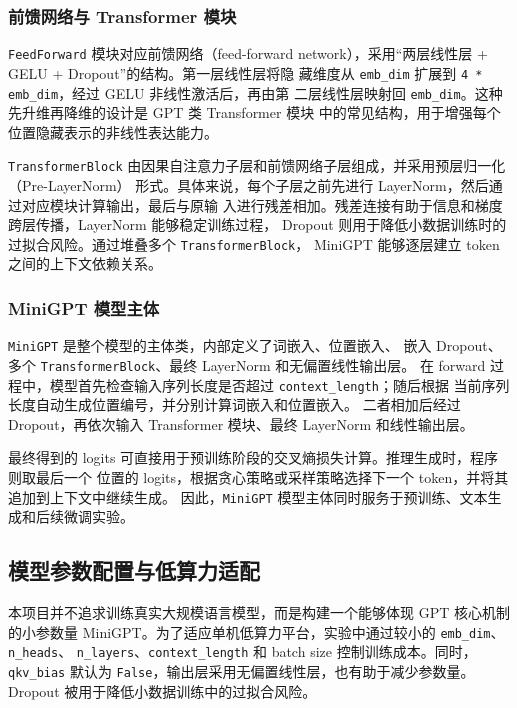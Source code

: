 \documentclass[UTF8,a4paper,zihao=-4,fontset=none]{ctexart}
\numberwithin{equation}{section}
\begin{document}
\subsubsection{前馈网络与 Transformer 模块}

\texttt{FeedForward} 模块对应前馈网络（feed-forward network），采用“两层线性层 + GELU + Dropout”的结构。第一层线性层将隐
藏维度从 \texttt{emb\_dim} 扩展到 \texttt{4 * emb\_dim}，经过 GELU 非线性激活后，再由第
二层线性层映射回 \texttt{emb\_dim}。这种先升维再降维的设计是 GPT 类 Transformer 模块
中的常见结构，用于增强每个位置隐藏表示的非线性表达能力。

\texttt{TransformerBlock} 由因果自注意力子层和前馈网络子层组成，并采用预层归一化（Pre-LayerNorm）
形式。具体来说，每个子层之前先进行 LayerNorm，然后通过对应模块计算输出，最后与原输
入进行残差相加。残差连接有助于信息和梯度跨层传播，LayerNorm 能够稳定训练过程，
Dropout 则用于降低小数据训练时的过拟合风险。通过堆叠多个 \texttt{TransformerBlock}，
MiniGPT 能够逐层建立 token 之间的上下文依赖关系。

\subsubsection{MiniGPT 模型主体}

\texttt{MiniGPT} 是整个模型的主体类，内部定义了词嵌入、位置嵌入、
嵌入 Dropout、多个 \texttt{TransformerBlock}、最终 LayerNorm 和无偏置线性输出层。
在 forward 过程中，模型首先检查输入序列长度是否超过 \texttt{context\_length}；随后根据
当前序列长度自动生成位置编号，并分别计算词嵌入和位置嵌入。
二者相加后经过 Dropout，再依次输入 Transformer 模块、最终 LayerNorm 和线性输出层。

最终得到的 logits 可直接用于预训练阶段的交叉熵损失计算。推理生成时，程序则取最后一个
位置的 logits，根据贪心策略或采样策略选择下一个 token，并将其追加到上下文中继续生成。
因此，\texttt{MiniGPT} 模型主体同时服务于预训练、文本生成和后续微调实验。

\subsection{模型参数配置与低算力适配}

本项目并不追求训练真实大规模语言模型，而是构建一个能够体现 GPT 核心机制的小参数量
MiniGPT。为了适应单机低算力平台，实验中通过较小的 \texttt{emb\_dim}、\texttt{n\_heads}、
\texttt{n\_layers}、\texttt{context\_length} 和 batch size 控制训练成本。同时，
\texttt{qkv\_bias} 默认为 \texttt{False}，输出层采用无偏置线性层，也有助于减少参数量。
Dropout 被用于降低小数据训练中的过拟合风险。
\end{document}
